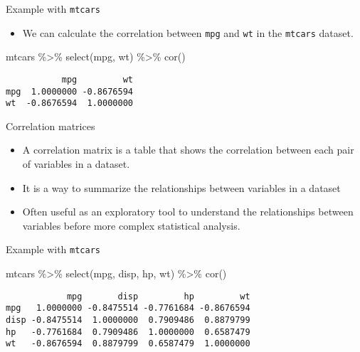 \documentclass[
  10pt,
  ignorenonframetext,
]{beamer}
\newenvironment{Shaded}{\begin{snugshade}}{\end{snugshade}}
\newcommand{\FunctionTok}[1]{\textcolor[rgb]{0.28,0.35,0.67}{#1}}
\newcommand{\NormalTok}[1]{\textcolor[rgb]{0.00,0.23,0.31}{#1}}
\newcommand{\SpecialCharTok}[1]{\textcolor[rgb]{0.37,0.37,0.37}{#1}}
\providecommand{\tightlist}{%
  \setlength{\itemsep}{0pt}\setlength{\parskip}{0pt}}\usepackage{longtable,booktabs,array}
\begin{document}
\begin{frame}[fragile]{Example with \texttt{mtcars}}
\label{example-with-mtcars-1}
\begin{itemize}
\tightlist
\item
  We can calculate the correlation between \texttt{mpg} and \texttt{wt}
  in the \texttt{mtcars} dataset.
\end{itemize}

\begin{Shaded}
\begin{Highlighting}[]
\NormalTok{mtcars }\SpecialCharTok{\%\textgreater{}\%} 
    \FunctionTok{select}\NormalTok{(mpg, wt) }\SpecialCharTok{\%\textgreater{}\%} 
    \FunctionTok{cor}\NormalTok{()}
\end{Highlighting}
\end{Shaded}

\begin{verbatim}
           mpg         wt
mpg  1.0000000 -0.8676594
wt  -0.8676594  1.0000000
\end{verbatim}
\end{frame}

\begin{frame}{Correlation matrices}
\label{correlation-matrices}
\begin{itemize}
\item
  A correlation matrix is a table that shows the correlation between
  each pair of variables in a dataset.
\item
  It is a way to summarize the relationships between variables in a
  dataset
\item
  Often useful as an exploratory tool to understand the relationships
  between variables before more complex statistical analysis.
\end{itemize}
\end{frame}

\begin{frame}[fragile]{Example with \texttt{mtcars}}
\label{example-with-mtcars-2}
\begin{Shaded}
\begin{Highlighting}[]
\NormalTok{mtcars }\SpecialCharTok{\%\textgreater{}\%} 
    \FunctionTok{select}\NormalTok{(mpg, disp, hp, wt) }\SpecialCharTok{\%\textgreater{}\%} 
    \FunctionTok{cor}\NormalTok{()}
\end{Highlighting}
\end{Shaded}

\begin{verbatim}
            mpg       disp         hp         wt
mpg   1.0000000 -0.8475514 -0.7761684 -0.8676594
disp -0.8475514  1.0000000  0.7909486  0.8879799
hp   -0.7761684  0.7909486  1.0000000  0.6587479
wt   -0.8676594  0.8879799  0.6587479  1.0000000
\end{verbatim}
\end{frame}
\end{document}
